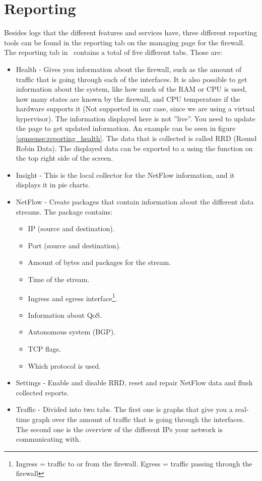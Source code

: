 \newpage

\section{Reporting}
Besides logs that the different features and services have, three different reporting tools can be found in the reporting tab on the managing page for the firewall. The reporting tab in \opnsense\ contains a total of five different tabs. Those are:
\begin{itemize}
    \item Health - Gives you information about the firewall, such as the amount of traffic that is going through each of the interfaces. It is also possible to get information about the system, like how much of the RAM or CPU is used, how many states are known by the firewall, and CPU temperature if the hardware supports it (Not supported in our case, since we are using a virtual hypervisor). The information displayed here is not ''live''. You need to update the page to get updated information. An example can be seen in figure \ref{opnsense:reporting_health}. The data that is collected is called RRD (Round Robin Data). The displayed data can be exported to a  using the  function on the top right side of the screen.
    \item Insight - This is the local collector for the NetFlow information, and it displays it in pie charts. 
    \item NetFlow - Create packages that contain information about the different data streams. The package contains:
    \begin{itemize}
        \item IP (source and destination).
        \item Port (source and destination).
        \item Amount of bytes and packages for the stream.
        \item Time of the stream.
        \item Ingress and egress interface\footnote{Ingress = traffic to or from the firewall. Egress = traffic passing through the firewall}.
        \item Information about QoS.
        \item Autonomous system (BGP).
        \item TCP flags.
        \item Which protocol is used.
    \end{itemize}
    \item Settings - Enable and disable RRD, reset and repair NetFlow data and flush collected reports.
    \item Traffic - Divided into two tabs. The first one is graphs that give you a real-time graph over the amount of traffic that is going through the interfaces. The second one is the overview of the different IPs your network is communicating with.
\end{itemize}

